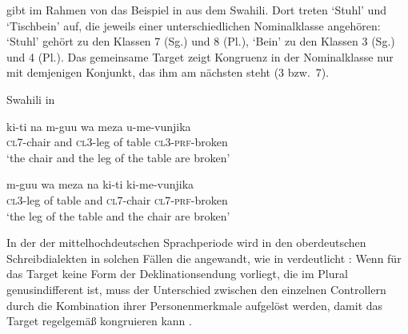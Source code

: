 \citet[169]{corbett2006} gibt im Rahmen von  das Beispiel
in  aus dem Swahili. Dort treten  `Stuhl' und
 `Tischbein' auf, die jeweils einer unterschiedlichen
Nominalklasse angehören:  `Stuhl' gehört zu den Klassen 7 (Sg.) und 8
(Pl.),  `Bein' zu den Klassen 3 (Sg.) und 4 (Pl.). Das gemeinsame
Target  zeigt Kongruenz in der Nominalklasse nur mit
demjenigen Konjunkt, das ihm am nächsten steht (3 bzw.~7).

\begin{exe}
\ex \label{ex:cca}
	\langinfo%
		{Swahili}%
		{}%
		{\cite[45]{bokamba1985} in \cite[169]{corbett2006}}
	\begin{xlist}
	\ex \label{ex:cca_1}
		\gll ki-ti na m-guu wa meza u-me-vunjika \\
			\textsc{cl7}-chair and \textsc{cl3}-leg of table
			\textsc{cl3}-\textsc{prf}-broken \\
		\trans `the chair and the leg of the table are broken'

	\ex \label{ex:cca_2}
		\gll m-guu wa meza na ki-ti ki-me-vunjika \\
			\textsc{cl3}-leg of table and \textsc{cl7}-chair
			\textsc{cl7}-\textsc{prf}-broken \\
		\trans `the leg of the table and the chair are broken'
	\end{xlist}
\end{exe}

In der  der mittelhochdeutschen
Sprachperiode wird in den oberdeutschen Schreibdialekten in
solchen Fällen die  angewandt, wie in
 verdeutlicht
\autocites[vgl.][312]{grimm1890}[329]{grimm1898}[39--41]{behaghel1928}[187--189]{dal2014}:
Wenn für das Target keine Form der Deklinationsendung vorliegt, die im Plural
genusindifferent ist, muss der Unterschied zwischen den
einzelnen Controllern durch die Kombination ihrer
Personenmerkmale aufgelöst werden, damit das Target
regelgemäß kongruieren kann
\autocites[vgl.][182--193]{corbett1983}[269--306]{corbett1991}[243--263]{corbett2006}.

